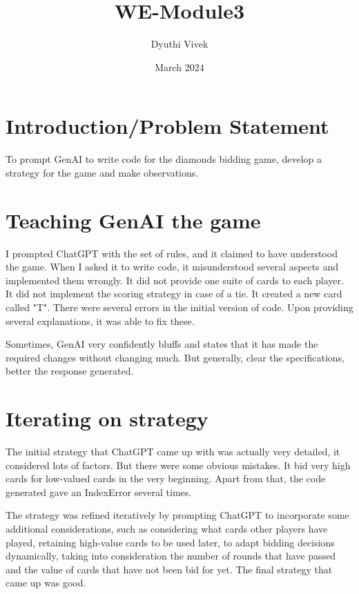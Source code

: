 \documentclass{article}
\title{WE-Module3}
\author{Dyuthi Vivek}
\date{March 2024}
\begin{document}
\maketitle

\section{Introduction/Problem Statement}
To prompt GenAI to write code for the diamonds bidding game, develop a strategy for the game and make observations.

\medskip

\section{Teaching GenAI the game}
I prompted ChatGPT with the set of rules, and it claimed to have understood the game. When I asked it to write code, it misunderstood several aspects and implemented them wrongly. It did not provide one suite of cards to each player. It did not implement the scoring strategy in case of a tie. It created a new card called "T". There were several errors in the initial version of code. Upon providing several explanations, it was able to fix these. 

\medskip
Sometimes, GenAI very confidently bluffs and states that it has made the required changes without changing much. But generally, clear the specifications, better the response generated.

\medskip

\section{Iterating on strategy}
The initial strategy that ChatGPT came up with was actually very detailed, it considered lots of factors. But there were some obvious mistakes. It bid very high cards for low-valued cards in the very beginning. Apart from that, the code generated gave an IndexError several times. 

\medskip

The strategy was refined iteratively by prompting ChatGPT to incorporate some additional considerations, such as considering what cards other players have played, retaining high-value cards to be used later, to adapt bidding decisions dynamically, taking into consideration the number of rounds that have passed and the value of cards that have not been bid for yet. The final strategy that came up was good.
\end{document}
